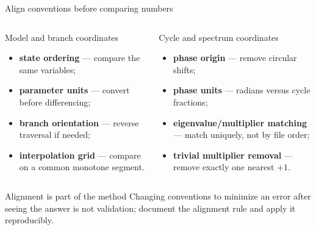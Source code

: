 \begin{frame}{Align conventions before comparing numbers}
\small
\begin{columns}[T,onlytextwidth]
\begin{block}{Model and branch coordinates}
\begin{itemize}
  \item \textbf{state ordering} --- compare the same variables;
  \item \textbf{parameter units} --- convert before differencing;
  \item \textbf{branch orientation} --- reverse traversal if needed;
  \item \textbf{interpolation grid} --- compare on a common monotone segment.
\end{itemize}
\end{block}
\begin{block}{Cycle and spectrum coordinates}
\begin{itemize}
  \item \textbf{phase origin} --- remove circular shifts;
  \item \textbf{phase units} --- radians versus cycle fractions;
  \item \textbf{eigenvalue/multiplier matching} --- match uniquely, not by file order;
  \item \textbf{trivial multiplier removal} --- remove exactly one nearest $+1$.
\end{itemize}
\end{block}
\end{columns}
\vspace{2mm}
\begin{alertblock}{Alignment is part of the method}
Changing conventions to minimize an error after seeing the answer is not validation; document the alignment rule and apply it reproducibly.
\end{alertblock}
\end{frame}

